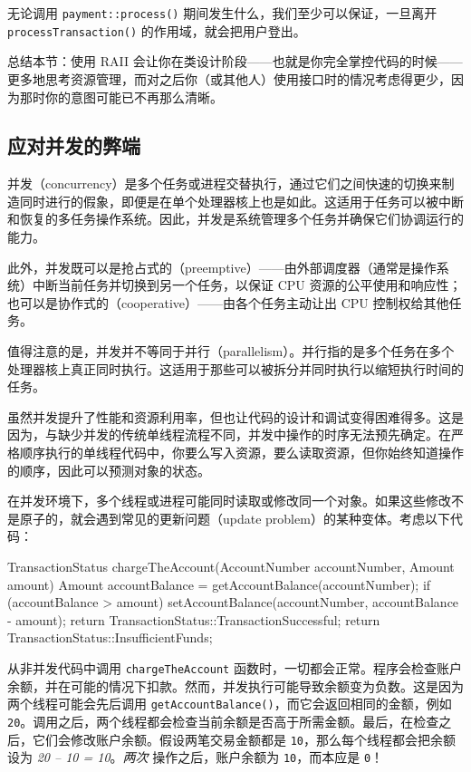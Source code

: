 \label{idx:1018}
无论调用 \texttt{payment::\allowbreak{}process(\allowbreak{})\allowbreak{}} 期间发生什么，我们至少可以保证，一旦离开 \texttt{process\allowbreak{}Transaction(\allowbreak{})\allowbreak{}} 的作用域，就会把用户登出。

总结本节：使用 RAII 会让你在类设计阶段——也就是你完全掌控代码的时候——更多地思考资源管理，而对之后你（或其他人）使用接口时的情况考虑得更少，因为那时你的意图可能已不再那么清晰。

\subsection{应对并发的弊端}

\label{idx:1019}
并发（concurrency）是多个任务或进程交替执行，通过它们之间快速的切换来制造同时进行的假象，即便是在单个处理器核上也是如此。这适用于任务可以被中断和恢复的多任务操作系统。因此，并发是系统管理多个任务并确保它们协调运行的能力。

此外，并发既可以是抢占式的（preemptive）——由外部调度器（通常是操作系统）中断当前任务并切换到另一个任务，以保证 CPU 资源的公平使用和响应性；也可以是协作式的（cooperative）——由各个任务主动让出 CPU 控制权给其他任务。

值得注意的是，并发并不等同于并行（parallelism）。并行指的是多个任务在多个处理器核上真正同时执行。这适用于那些可以被拆分并同时执行以缩短执行时间的任务。


\label{idx:1020}
虽然并发提升了性能和资源利用率，但也让代码的设计和调试变得困难得多。这是因为，与缺少并发的传统单线程流程不同，并发中操作的时序无法预先确定。在严格顺序执行的单线程代码中，你要么写入资源，要么读取资源，但你始终知道操作的顺序，因此可以预测对象的状态。

在并发环境下，多个线程或进程可能同时读取或修改同一个对象。如果这些修改不是原子的，就会遇到常见的更新问题（update problem）的某种变体。考虑以下代码：

\begin{codebox}[text]
TransactionStatus chargeTheAccount(AccountNumber accountNumber, Amount amount)
{
  Amount accountBalance = getAccountBalance(accountNumber);
  if (accountBalance > amount)
  {
    setAccountBalance(accountNumber, accountBalance - amount);
    return TransactionStatus::TransactionSuccessful;
  }
  return TransactionStatus::InsufficientFunds;
}
\end{codebox}

\label{idx:1021}
从非并发代码中调用 \texttt{charge\allowbreak{}The\allowbreak{}Account} 函数时，一切都会正常。程序会检查账户余额，并在可能的情况下扣款。然而，并发执行可能导致余额变为负数。这是因为两个线程可能会先后调用 \texttt{get\allowbreak{}Account\allowbreak{}Balance(\allowbreak{})\allowbreak{}}，而它会返回相同的金额，例如 \texttt{20}。调用之后，两个线程都会检查当前余额是否高于所需金额。最后，在检查之后，它们会修改账户余额。假设两笔交易金额都是 \texttt{10}，那么每个线程都会把余额设为 \emph{20 – 10 = 10}。\emph{两次 }操作之后，账户余额为 \texttt{10}，而本应是 \texttt{0}！

